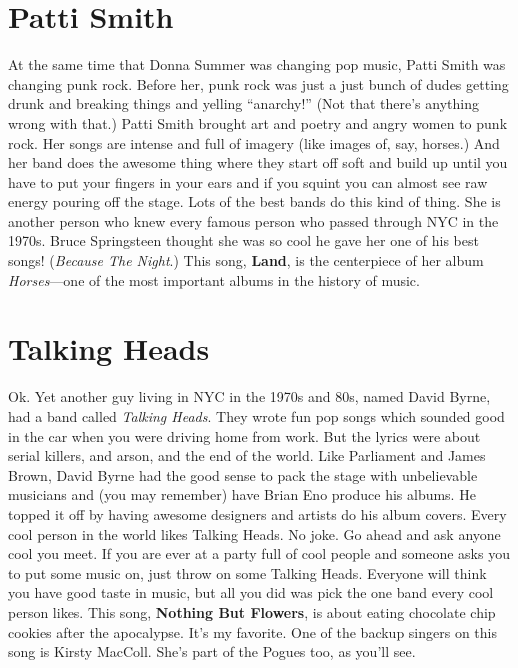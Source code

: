 \documentclass[letterpaper,single]{article}
\begin{document}
\section{Patti Smith}
At the same time that Donna Summer was changing pop music, Patti Smith
was changing punk rock. Before her, punk rock was just a just bunch of
dudes getting drunk and breaking things and yelling ``anarchy!'' (Not
that there's anything wrong with that.) Patti Smith brought art and
poetry and angry women to punk rock. Her songs are intense and full of
imagery (like images of, say, horses.) And her band does the awesome
thing where they start off soft and build up until you have to put your
fingers in your ears and if you squint you can almost see raw energy
pouring off the stage. Lots of the best bands do this kind of thing. She
is another person who knew every famous person who passed through NYC in
the 1970s. Bruce Springsteen thought she was so cool he gave her one of
his best songs! (\emph{Because The Night}.) This song, \textbf{Land}, is
the centerpiece of her album \emph{Horses}---one of the most important
albums in the history of music.

\section{Talking Heads}
Ok. Yet another guy living in NYC in the 1970s and 80s, named David
Byrne, had a band called \emph{Talking Heads}. They wrote fun pop songs
which sounded good in the car when you were driving home from work. But
the lyrics were about serial killers, and arson, and the end of the
world. Like Parliament and James Brown, David Byrne had the good sense
to pack the stage with unbelievable musicians and (you may remember)
have Brian Eno produce his albums. He topped it off by having awesome
designers and artists do his album covers. Every cool person in the
world likes Talking Heads. No joke. Go ahead and ask anyone cool you
meet. If you are ever at a party full of cool people and someone asks
you to put some music on, just throw on some Talking Heads. Everyone
will think you have good taste in music, but all you did was pick
the one band every cool person likes. This song, \textbf{Nothing But
Flowers}, is about eating chocolate chip cookies after the apocalypse.
It's my favorite. One of the backup singers on this song is Kirsty
MacColl. She's part of the Pogues too, as you'll see.
\end{document}
